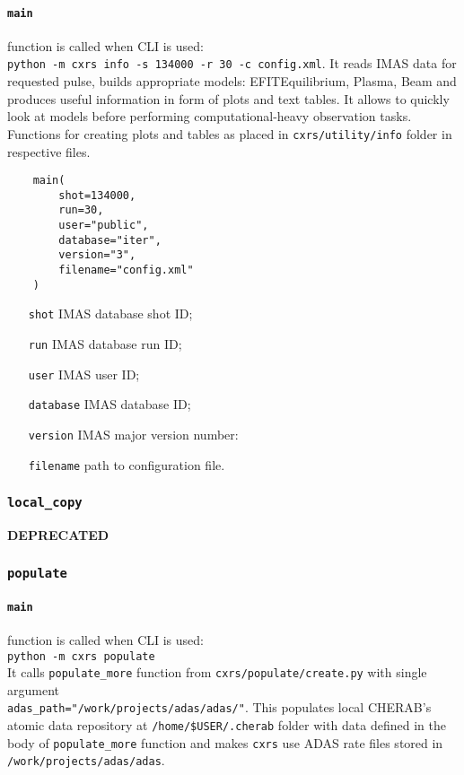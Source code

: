 \documentclass[../../main]{subfiles}
\begin{document}
\paragraph{\texttt{main}} function is called when CLI is used:\\
\texttt{python -m cxrs info -s 134000 -r 30 -c config.xml}.
It reads IMAS data for requested pulse, builds appropriate models: EFITEquilibrium, Plasma, Beam and produces useful information in form of plots and text tables. It allows to quickly look at models before performing computational-heavy observation tasks.
Functions for creating plots and tables as placed in \texttt{cxrs/utility/info} folder in respective files.

\begin{verbatim}
    main(
        shot=134000,
        run=30,
        user="public",
        database="iter",
        version="3",
        filename="config.xml"
    )
\end{verbatim}

\begin{itemize}[align=left]
    \item[\texttt{shot}] IMAS database shot ID;
    \item[\texttt{run}] IMAS database run ID;
    \item[\texttt{user}] IMAS user ID;
    \item[\texttt{database}] IMAS database ID;
    \item[\texttt{version}] IMAS major version number:
    \item[\texttt{filename}] path to configuration file.
\end{itemize}

\subsubsection{\texttt{local\_copy}}
\textbf{DEPRECATED}

\subsubsection{\texttt{populate}}

\paragraph{\texttt{main}} function is called when CLI is used:\\
\texttt{python -m cxrs populate}\\
It calls \texttt{populate\_more} function from \texttt{cxrs/populate/create.py} with single argument \\ \texttt{adas\_path="/work/projects/adas/adas/"}. This populates local CHERAB's atomic data repository at \texttt{/home/\$USER/.cherab} folder with data defined in the body of \texttt{populate\_more} function and makes \texttt{cxrs} use ADAS rate files stored in \texttt{/work/projects/adas/adas}.
\end{document}
